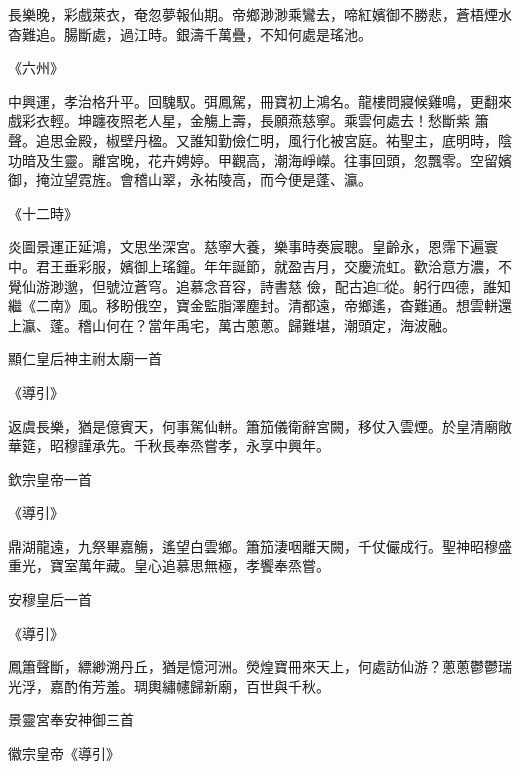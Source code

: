 \begin{pinyinscope}
 長樂晚，彩戲萊衣，奄忽夢報仙期。帝鄉渺渺乘鸞去，啼紅嬪御不勝悲，蒼梧煙水杳難追。腸斷處，過江時。銀濤千萬疊，不知何處是瑤池。



 《六州》



 中興運，孝治格升平。回騩馭。弭鳳駕，冊寶初上鴻名。龍樓問寢候雞鳴，更翻來戲彩衣輕。坤躔夜照老人星，金觴上壽，長願燕慈寧。乘雲何處去！愁斷紫
 簫聲。追思金殿，椒壁丹楹。又誰知勤儉仁明，風行化被宮庭。祐聖主，底明時，陰功暗及生靈。離宮晚，花卉娉婷。甲觀高，潮海崢嶸。往事回頭，忽飄零。空留嬪御，掩泣望霓旌。會稽山翠，永祐陵高，而今便是蓬、瀛。



 《十二時》



 炎圖景運正延鴻，文思坐深宮。慈寧大養，樂事時奏宸聰。皇齡永，恩霈下遍寰中。君王垂彩服，嬪御上瑤鐘。年年誕節，就盈吉月，交慶流虹。歡洽意方濃，不覺仙游渺邈，但號泣蒼穹。追慕念音容，詩書慈
 儉，配古追□從。躬行四德，誰知繼《二南》風。移盼俄空，寶金監脂澤塵封。清都遠，帝鄉遙，杳難通。想雲軿還上瀛、蓬。稽山何在？當年禹宅，萬古蔥蔥。歸難堪，潮頭定，海波融。



 顯仁皇后神主祔太廟一首



 《導引》



 返虞長樂，猶是億賓天，何事駕仙軿。簫笳儀衛辭宮闕，移仗入雲煙。於皇清廟敞華筵，昭穆謹承先。千秋長奉烝嘗孝，永享中興年。



 欽宗皇帝一首



 《導引》



 鼎湖龍遠，九祭畢嘉觴，遙望白雲鄉。簫笳淒咽離天闕，千仗儼成行。聖神昭穆盛重光，寶室萬年藏。皇心追慕思無極，孝饗奉烝嘗。



 安穆皇后一首



 《導引》



 鳳簫聲斷，縹緲溯丹丘，猶是憶河洲。熒煌寶冊來天上，何處訪仙游？蔥蔥鬱鬱瑞光浮，嘉酌侑芳羞。琱輿繡幰歸新廟，百世與千秋。



 景靈宮奉安神御三首



 徽宗皇帝《導引》




\end{pinyinscope}
